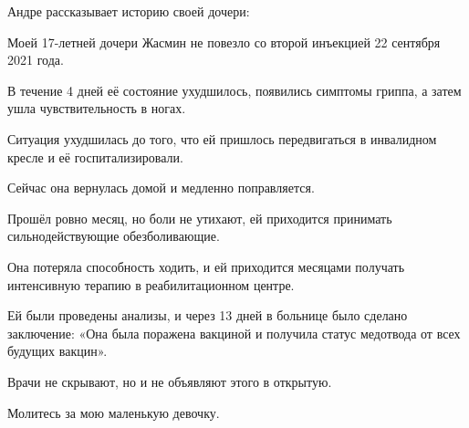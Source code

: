 Андре рассказывает историю своей дочери:

Моей 17-летней дочери Жасмин не повезло со второй инъекцией 22 сентября 2021
года.

В течение 4 дней её состояние ухудшилось, появились симптомы гриппа, а затем
ушла чувствительность в ногах.

Ситуация ухудшилась до того, что ей пришлось передвигаться в инвалидном кресле и
её госпитализировали.

Сейчас она вернулась домой и медленно поправляется.

Прошёл ровно месяц, но боли не утихают, ей приходится принимать
сильнодействующие обезболивающие.

Она потеряла способность ходить, и ей приходится месяцами получать интенсивную
терапию в реабилитационном центре.

Ей были проведены анализы, и через 13 дней в больнице было сделано заключение:
«Она была поражена вакциной и получила статус медотвода от всех будущих вакцин».

Врачи не скрывают, но и не объявляют этого в открытую.

Молитесь за мою маленькую девочку.
